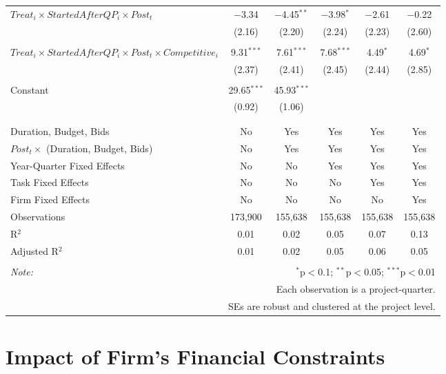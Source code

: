 \documentclass[
]{article}
\begin{document}
\begin{table}[H]
\begin{tabular}{@{\extracolsep{-2pt}}lccccc}
 $Treat_i \times StartedAfterQP_i \times Post_t$ & $-$3.34 & $-$4.45$^{**}$ & $-$3.98$^{*}$ & $-$2.61 & $-$0.22 \\ 
  & (2.16) & (2.20) & (2.24) & (2.23) & (2.60) \\ 
  & & & & & \\ 
 $Treat_i \times StartedAfterQP_i \times Post_t \times Competitive_i$ & 9.31$^{***}$ & 7.61$^{***}$ & 7.68$^{***}$ & 4.49$^{*}$ & 4.69$^{*}$ \\ 
  & (2.37) & (2.41) & (2.45) & (2.44) & (2.85) \\ 
  & & & & & \\ 
 Constant & 29.65$^{***}$ & 45.93$^{***}$ &  &  &  \\ 
  & (0.92) & (1.06) &  &  &  \\ 
  & & & & & \\ 
\hline \\[-1.8ex] 
Duration, Budget, Bids & No & Yes & Yes & Yes & Yes \\ 
$Post_t \times $  (Duration, Budget, Bids) & No & Yes & Yes & Yes & Yes \\ 
Year-Quarter Fixed Effects & No & No & Yes & Yes & Yes \\ 
Task Fixed Effects & No & No & No & Yes & Yes \\ 
Firm Fixed Effects & No & No & No & No & Yes \\ 
Observations & 173,900 & 155,638 & 155,638 & 155,638 & 155,638 \\ 
R$^{2}$ & 0.01 & 0.02 & 0.05 & 0.07 & 0.13 \\ 
Adjusted R$^{2}$ & 0.01 & 0.02 & 0.05 & 0.06 & 0.05 \\ 
\hline 
\hline \\[-1.8ex] 
\textit{Note:}  & \multicolumn{5}{r}{$^{*}$p$<$0.1; $^{**}$p$<$0.05; $^{***}$p$<$0.01} \\ 
 & \multicolumn{5}{r}{Each observation is a project-quarter.} \\ 
 & \multicolumn{5}{r}{SEs are robust and clustered at the project level.} \\ 
\end{tabular} 
\end{table}

\hypertarget{impact-of-firms-financial-constraints}{%
\section{Impact of Firm's Financial
Constraints}\label{impact-of-firms-financial-constraints}}
\end{document}
